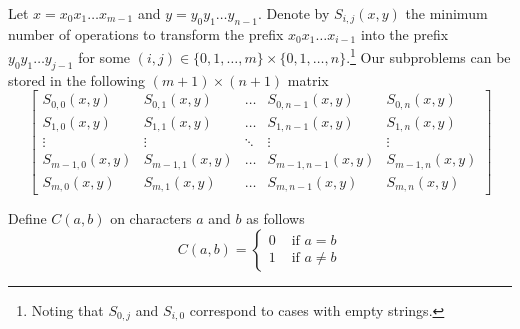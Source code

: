 \begin{solution}
    Let $x=x_0x_1\hdots x_{m-1}$ and $y=y_0y_1\hdots y_{n-1}$. Denote by $S_{i,j}(x, y)$ the minimum number of operations to transform the prefix $x_0x_1\hdots x_{i-1}$ into the prefix $y_0y_1\hdots y_{j-1}$ for some $(i, j)\in\{0,1,\hdots, m\}\times\{0, 1,\hdots, n\}$.\footnote{Noting that $S_{0,j}$ and $S_{i,0}$ correspond to cases with empty strings.} Our subproblems can be stored in the following $(m+1)\times(n+1)$ matrix
    \[\begin{bmatrix}
            S_{0,0}(x, y)   & S_{0,1}(x, y)    & \hdots & S_{0,n-1}(x, y)    & S_{0, n}(x, y)   \\
            S_{1,0}(x, y)   & S_{1,1}(x, y)    & \hdots & S_{1,n-1}(x, y)    & S_{1, n}(x, y)   \\
            \vdots          & \vdots           & \ddots & \vdots             & \vdots           \\
            S_{m-1,0}(x, y) & S_{m-1, 1}(x, y) & \hdots & S_{m-1, n-1}(x, y) & S_{m-1, n}(x, y) \\
            S_{m,0}(x, y)   & S_{m, 1}(x, y)   & \hdots & S_{m, n-1}(x, y)   & S_{m, n}(x, y)
        \end{bmatrix}\]

    Define $C(a, b)$ on characters $a$ and $b$ as follows
    \[C(a,b) = \begin{cases}
            0 & \text{ if }a=b     \\
            1 & \text{ if }a\neq b
        \end{cases}\]


\end{solution}
